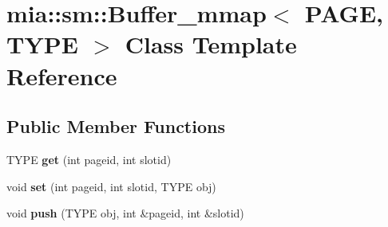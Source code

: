 \hypertarget{classmia_1_1sm_1_1_buffer__mmap}{\section{mia\-:\-:sm\-:\-:Buffer\-\_\-mmap$<$ P\-A\-G\-E, T\-Y\-P\-E $>$ Class Template Reference}
\label{classmia_1_1sm_1_1_buffer__mmap}
}
\subsection*{Public Member Functions}
\begin{DoxyCompactItemize}
\item 
\hypertarget{classmia_1_1sm_1_1_buffer__mmap_a1b5a3c28e2be2b8d28b6f0e83c67eb27}{T\-Y\-P\-E {\bfseries get} (int pageid, int slotid)}\label{classmia_1_1sm_1_1_buffer__mmap_a1b5a3c28e2be2b8d28b6f0e83c67eb27}

\item 
\hypertarget{classmia_1_1sm_1_1_buffer__mmap_afa43a903959215eb074be496d3afc67a}{void {\bfseries set} (int pageid, int slotid, T\-Y\-P\-E obj)}\label{classmia_1_1sm_1_1_buffer__mmap_afa43a903959215eb074be496d3afc67a}

\item 
\hypertarget{classmia_1_1sm_1_1_buffer__mmap_aed36ed7fcf3a9ca9d9300f2caff2ee60}{void {\bfseries push} (T\-Y\-P\-E obj, int \&pageid, int \&slotid)}\label{classmia_1_1sm_1_1_buffer__mmap_aed36ed7fcf3a9ca9d9300f2caff2ee60}

\end{DoxyCompactItemize}
